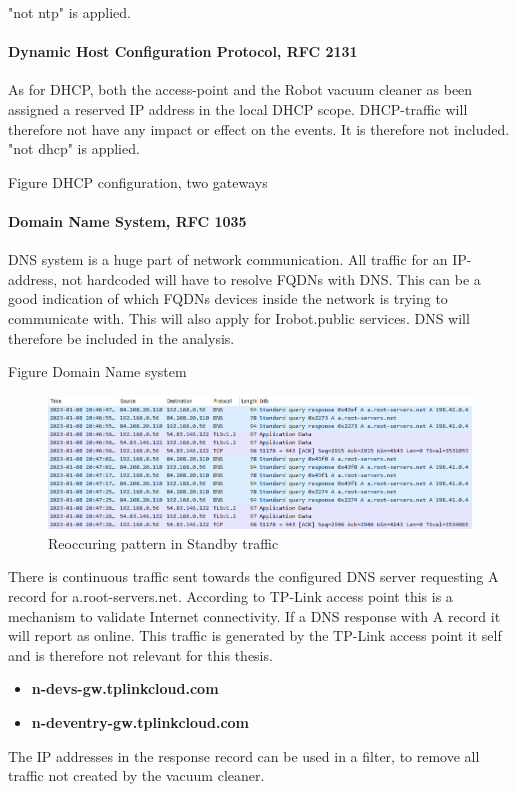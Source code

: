 "not ntp" is applied. 

\paragraph{Dynamic Host Configuration Protocol, RFC 2131}
As for DHCP, both the access-point and the Robot vacuum cleaner as been assigned a reserved IP address in the local DHCP scope. DHCP-traffic will therefore not have any impact or effect on the events. It is therefore not included. "not dhcp" is applied. \cite{rfc2131_dhcp}

Figure DHCP configuration, two gateways

\paragraph{Domain Name System, RFC 1035}
DNS system is a huge part of network communication. All traffic for an IP-address, not hardcoded will have to resolve FQDNs with DNS. This can be a good indication of which FQDNs devices inside the network is trying to communicate with. This will also apply for Irobot.public services. DNS will therefore be included in the analysis. 

Figure Domain Name system

\begin{figure}[!ht]
    \centering
    \includegraphics[width=\textwidth]{figures/Wireshark_standby_reoccuring.png}
    \caption{Reoccuring pattern in Standby traffic}
    \label{fig:WSR}
\end{figure}

There is continuous traffic sent towards the configured DNS server requesting A record for a.root-servers.net. According to TP-Link access point this is a mechanism to validate Internet connectivity. If a DNS response with A record it will report as online. This traffic is generated by the TP-Link access point it self and is therefore not relevant for this thesis. 
\begin{itemize}
    \item \textbf{n-devs-gw.tplinkcloud.com}
    \item \textbf{n-deventry-gw.tplinkcloud.com}
\end{itemize}
The IP addresses in the response record can be used in a filter, to remove all traffic not created by the vacuum cleaner. 


